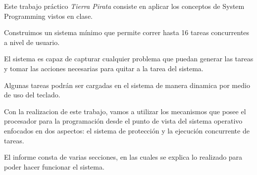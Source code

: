 Este trabajo pr\'actico \textit{Tierra Pirata} consiste en aplicar los conceptos de System Programming vistos en clase.

Construimos un sistema m\'inimo que permite correr hasta 16 tareas concurrentes a nivel de usuario.

El sistema es capaz de capturar cualquier problema que puedan generar las tareas y tomar las acciones necesarias para quitar a la tarea del sistema.

Algunas tareas podr\'an ser cargadas en el sistema de manera dinamica por medio de uso del teclado.

Con la realizacion de este trabajo, vamos a utilizar los mecanismos que posee el procesador para la programaci\'on desde el punto de vista del sistema operativo enfocados en dos aspectos: el sistema de protecci\'on y la ejecuci\'on concurrente de tareas.

El informe consta de varias secciones, en las cuales se explica lo realizado para poder hacer funcionar el sistema.